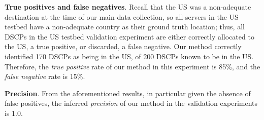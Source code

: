 \textbf{True positives and false negatives}. Recall that the US was a 
non-adequate destination at the time of our main data collection,
so all servers in the US testbed
have a non-adequate country as their ground truth location; %
thus, all DSCPs in the US testbed validation experiment are either
correctly allocated to the US, a true positive, or discarded, a false negative.
Our method correctly identified 170 DSCPs as being in the US,
of 200 DSCPs known to be in the US.
Therefore, the \textit{true positive} rate of our method in this experiment is 85\%,
and the \textit{false negative} rate is 15\%.

\textbf{Precision}. From the aforementioned results,
in particular given the absence of false positives,
the inferred \textit{precision} of our method 
in the validation experiments is 1.0.

